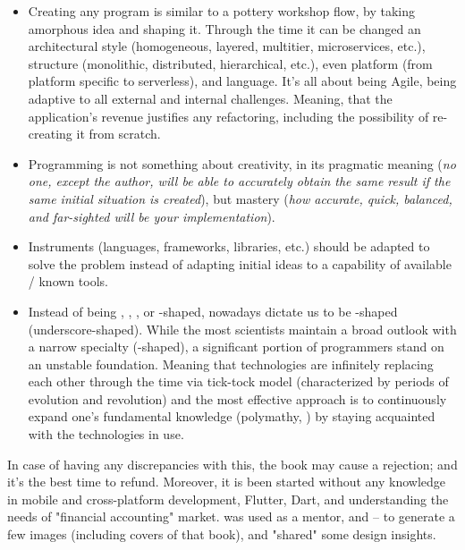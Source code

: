\begin{itemize}
\setlength{\itemsep}{3pt}
\setlength{\parskip}{0pt}
\setlength{\parsep}{0pt}
    \item Creating any program is similar to a pottery workshop flow, by taking amorphous idea and shaping it. Through 
    the time it can be changed an architectural style (homogeneous, layered, multitier, microservices, etc.), structure 
    (monolithic, distributed, hierarchical, etc.), even platform (from platform specific to serverless), and language. 
    It's all about being Agile, being adaptive to all external and internal challenges. Meaning, that the application's 
    revenue justifies any refactoring, including the possibility of re-creating it from scratch.

    \item Programming is not something about creativity, in its pragmatic meaning (\emph{no one, except the author, 
    will be able to accurately obtain the same result if the same initial situation is created}), but mastery 
    (\emph{how accurate, quick, balanced, and far-sighted will be your implementation}).

    \item Instruments (languages, frameworks, libraries, etc.) should be adapted to solve the problem instead of 
    adapting initial ideas to a capability of available / known tools.

    \item Instead of being , , , or -shaped, nowadays dictate us to be \q{\_}-shaped 
    (underscore-shaped). While the most scientists maintain a broad outlook with a narrow specialty (-shaped), a 
    significant portion of programmers stand on an unstable foundation. Meaning that technologies are infinitely 
    replacing each other through the time via tick-tock model (characterized by periods of evolution and revolution) 
    and the most effective approach is to continuously expand one's fundamental knowledge (polymathy, \cite{Root09}) 
    by staying acquainted with the technologies in use. 
\end{itemize}

\noindent In case of having any discrepancies with this, the book may cause a rejection; and it's the best time to 
refund. Moreover, it is been started without any knowledge in mobile and cross-platform development, Flutter, Dart, and 
understanding the needs of "financial accounting" market.  was used as a mentor, and  --
to generate a few images (including covers of that book), and "shared" some design insights.

